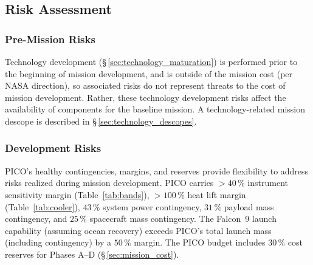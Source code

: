 \medskip
\subsection{Risk Assessment}
\label{sec:risk_assessment} %

\subsubsection{Pre-Mission Risks}
\label{sec:premission_risks} %

Technology development (\S\,\ref{sec:technology_maturation}) is performed prior to the beginning of mission development, and is outside of the mission cost (per NASA direction), so associated risks do not represent threats to the cost of mission development. Rather, these technology development risks affect the availability of components for the baseline mission. A technology-related mission descope is described in \S\,\ref{sec:technology_descopes}.

\subsubsection{Development Risks}
\label{sec:development_risks} %

PICO's healthy contingencies, margins, and reserves provide
flexibility to address risks realized during mission development. PICO
carries $>40\,\%$ instrument sensitivity margin (Table~\ref{tab:bands}),
$>100\,\%$ heat lift margin (Table~\ref{tab:cooler}), $43\,\%$ system
power contingency, $31\,\%$ payload mass contingency, and $25\,\%$
spacecraft mass contingency. The Falcon~9 launch capability (assuming ocean
recovery) exceeds PICO's total launch mass (including contingency) by
a $50\,\%$ margin. The PICO budget includes $30\,\%$ cost
reserves for Phases A--D (\S\,\ref{sec:mission_cost}).

